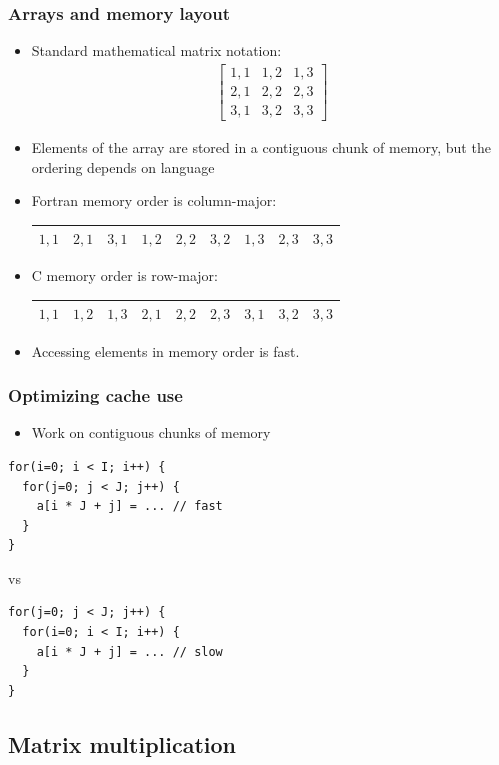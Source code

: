 \documentclass[usenames,dvipsnames,mathserif,compress]{beamer}
\begin{document}
\begin{frame}
  \frametitle{Arrays and memory layout}
  \begin{itemize}
  \item  Standard mathematical matrix notation:
  \begin{align}
    \left[
  \begin{matrix}
    1,1 & 1,2 & 1,3 \\
    2,1 & 2,2 & 2,3 \\
    3,1 & 3,2 & 3,3
  \end{matrix}
  \right]
  \end{align}
\item Elements of the array are stored in a \alert{contiguous} chunk of memory,
  but the ordering depends on language
\item Fortran memory order is \alert{column-major}:
  \begin{tabular}{|c|c|c|c|c|c|c|c|c|}
    \hline
     $1,1$&$2,1$&$3,1$&$1,2$&$2,2$&$3,2$&$1,3$&$2,3$&$3,3$ \\\hline
  \end{tabular}
\item C memory order is \alert{row-major}:
  \begin{tabular}{|c|c|c|c|c|c|c|c|c|}
    \hline
     $1,1$&$1,2$&$1,3$&$2,1$&$2,2$&$2,3$&$3,1$&$3,2$&$3,3$ \\\hline
  \end{tabular}
\item Accessing elements in memory order is fast.
  \end{itemize}
\end{frame}

\begin{frame}[fragile]
  \frametitle{Optimizing cache use}
  \begin{itemize}
  \item Work on contiguous chunks of memory
  \end{itemize}
\begin{lstlisting}
for(i=0; i < I; i++) {
  for(j=0; j < J; j++) {
    a[i * J + j] = ... // fast
  }
}
\end{lstlisting}
vs
\begin{lstlisting}
for(j=0; j < J; j++) {
  for(i=0; i < I; i++) {
    a[i * J + j] = ... // slow
  }
}
\end{lstlisting}
\end{frame}

\subsection*{Matrix multiplication}
\end{document}
